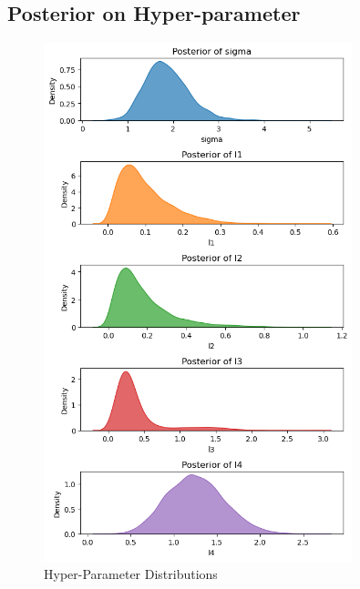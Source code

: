 \documentclass{article}
\begin{document}
\subsection{Posterior on Hyper-parameter}
\begin{figure}[H]  %
    \centering
    \includegraphics[width=0.8\textwidth]{GoodPlots/Parameter Distribution.png}  %
    \caption{Hyper-Parameter Distributions}
    \label{fig:my_graph}
\end{figure}


\newpage
\printbibliography
\end{document}
